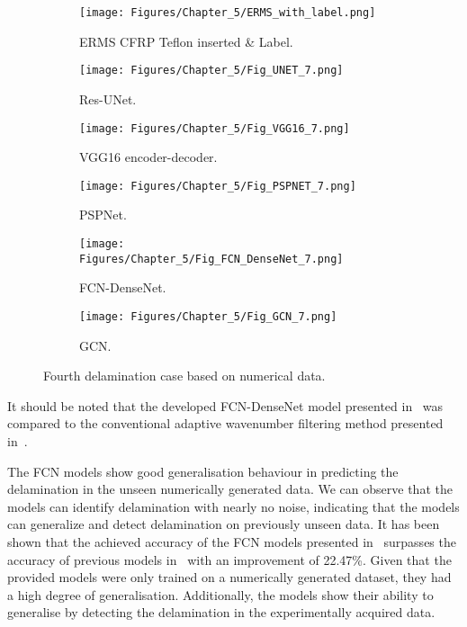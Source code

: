 \begin{figure} [!h]
	\centering
	\begin{subfigure}[b]{.48\textwidth}
		\centering
		\texttt{[image: Figures/Chapter\_5/ERMS\_with\_label.png]}
		\caption{ERMS CFRP Teflon inserted \& Label.}
		\label{fig:ERMS_with_label}
	\end{subfigure}
	\hfill
	\begin{subfigure}[b]{.48\textwidth}
		\centering
		\texttt{[image: Figures/Chapter\_5/Fig\_UNET\_7.png]}
		\caption{Res-UNet.}
		\label{fig:unet_exp_erms}	
	\end{subfigure}
	\hfill
	\begin{subfigure}[b]{.48\textwidth}
		\centering
		\texttt{[image: Figures/Chapter\_5/Fig\_VGG16\_7.png]}
		\caption{VGG16 encoder-decoder.}
		\label{fig:vgg16_exp_erms}
	\end{subfigure}
	\hfill
	\begin{subfigure}[b]{.48\textwidth}
		\centering
		\texttt{[image: Figures/Chapter\_5/Fig\_PSPNET\_7.png]}
		\caption{PSPNet.}
		\label{fig:pspnet_exp_erms}	
	\end{subfigure}
	\hfill
	\begin{subfigure}[b]{.48\textwidth}
		\centering
		\texttt{[image: Figures/Chapter\_5/Fig\_FCN\_DenseNet\_7.png]}
		\caption{FCN-DenseNet.}
		\label{fig:densenet_exp_erms}
	\end{subfigure}
	\hfill
	\begin{subfigure}[b]{.48\textwidth}
		\centering
		\texttt{[image: Figures/Chapter\_5/Fig\_GCN\_7.png]}
		\caption{GCN.}
		\label{fig:gcn_exp_erms}	
	\end{subfigure}
	\caption{Fourth delamination case based on numerical data.}
	\label{fig:exp_erms__case}
\end{figure}


It should be noted that the developed FCN-DenseNet model presented in~\cite{Ijjeh2021} was compared to the conventional adaptive wavenumber filtering method presented in~\cite{Kudela2015, Radzienski2019}.

The FCN models show good generalisation behaviour in predicting the delamination in the unseen numerically generated data.
We can observe that the models can identify delamination with nearly no noise, indicating that the models can generalize and detect delamination on previously unseen data.
It has been shown that the achieved accuracy of the FCN models presented in~\cite{Ijjeh2022} surpasses the accuracy of previous models in~\cite{Ijjeh2021} with an improvement of 22.47\%.
Given that the provided models were only trained on a numerically generated dataset, they had a high degree of generalisation.
Additionally, the models show their ability to generalise by detecting the delamination in the experimentally acquired data.

